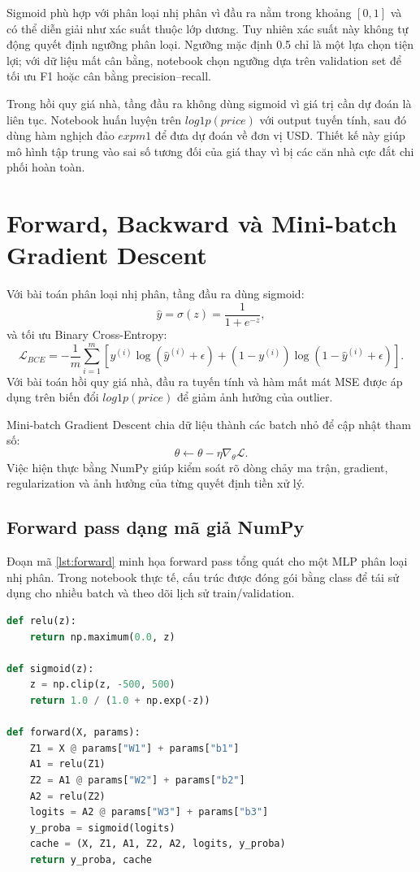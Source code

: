 \documentclass[12pt,a4paper]{report}
\begin{document}
Sigmoid phù hợp với phân loại nhị phân vì đầu ra nằm trong khoảng $[0,1]$ và có thể diễn giải như xác suất thuộc lớp dương.
Tuy nhiên xác suất này không tự động quyết định ngưỡng phân loại.
Ngưỡng mặc định 0.5 chỉ là một lựa chọn tiện lợi; với dữ liệu mất cân bằng, notebook chọn ngưỡng dựa trên validation set để tối ưu F1 hoặc cân bằng precision--recall.

Trong hồi quy giá nhà, tầng đầu ra không dùng sigmoid vì giá trị cần dự đoán là liên tục.
Notebook huấn luyện trên $log1p(price)$ với output tuyến tính, sau đó dùng hàm nghịch đảo $expm1$ để đưa dự đoán về đơn vị USD.
Thiết kế này giúp mô hình tập trung vào sai số tương đối của giá thay vì bị các căn nhà cực đắt chi phối hoàn toàn.

\section{Forward, Backward và Mini-batch Gradient Descent}
Với bài toán phân loại nhị phân, tầng đầu ra dùng sigmoid:
\begin{equation}
    \hat{y} = \sigma(z) = \frac{1}{1 + e^{-z}},
\end{equation}
và tối ưu Binary Cross-Entropy:
\begin{equation}
    \mathcal{L}_{BCE} =
    -\frac{1}{m}\sum_{i=1}^{m}
    \left[y^{(i)}\log(\hat{y}^{(i)}+\epsilon)
    +(1-y^{(i)})\log(1-\hat{y}^{(i)}+\epsilon)\right].
\end{equation}
Với bài toán hồi quy giá nhà, đầu ra tuyến tính và hàm mất mát MSE được áp dụng trên biến đổi $log1p(price)$ để giảm ảnh hưởng của outlier.

Mini-batch Gradient Descent chia dữ liệu thành các batch nhỏ để cập nhật tham số:
\begin{equation}
    \theta \leftarrow \theta - \eta \nabla_{\theta}\mathcal{L}.
\end{equation}
Việc hiện thực bằng NumPy giúp kiểm soát rõ dòng chảy ma trận, gradient, regularization và ảnh hưởng của từng quyết định tiền xử lý.

\subsection{Forward pass dạng mã giả NumPy}
Đoạn mã \ref{lst:forward} minh họa forward pass tổng quát cho một MLP phân loại nhị phân.
Trong notebook thực tế, cấu trúc được đóng gói bằng class để tái sử dụng cho nhiều batch và theo dõi lịch sử train/validation.

\begin{lstlisting}[language=Python, caption={Forward pass MLP phân loại nhị phân bằng NumPy}, label={lst:forward}]
def relu(z):
    return np.maximum(0.0, z)

def sigmoid(z):
    z = np.clip(z, -500, 500)
    return 1.0 / (1.0 + np.exp(-z))

def forward(X, params):
    Z1 = X @ params["W1"] + params["b1"]
    A1 = relu(Z1)
    Z2 = A1 @ params["W2"] + params["b2"]
    A2 = relu(Z2)
    logits = A2 @ params["W3"] + params["b3"]
    y_proba = sigmoid(logits)
    cache = (X, Z1, A1, Z2, A2, logits, y_proba)
    return y_proba, cache
\end{lstlisting}
\end{document}
